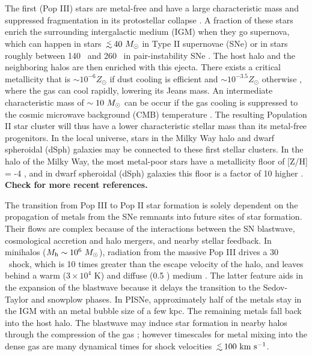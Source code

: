 \documentclass[apjl]{emulateapj}
\begin{document}
The first (Pop III) stars are metal-free and have a large
characteristic mass and suppressed fragmentation in its protostellar
collapse \citep{Abel00, ABN02, Bromm02_P3, Yoshida03, OShea07a}.  A
fraction of these stars enrich the surrounding intergalactic medium
(IGM) when they go supernova, which can happen in stars $\lsim40~\Ms$
in Type II supernovae (SNe) or in stars roughly between 140 \Ms~and
260 \Ms~in pair-instability SNe \citep[PISNe;][]{2002ApJ...567..532H}.
The host halo and the neighboring halos are then enriched with this
ejecta.  There exists a critical metallicity that is $\sim 10^{-6}
Z_\odot$ if dust cooling is efficient \citep{Omukai05,
  Schneider06_Frag, clark08} and $\sim 10^{-3.5} Z_\odot$ otherwise
\citep{Bromm01, 2009ApJ...691..441S}, where the gas can cool rapidly,
lowering its Jeans mass.  An intermediate characteristic mass of
$\sim10~\Ms$ can be occur if the gas cooling is suppressed to the
cosmic microwave background (CMB) temperature \citep{Larson98,
  Tumlinson07_IMF, 2009ApJ...691..441S}.  The resulting Population II
star cluster will thus have a lower characteristic stellar mass than
its metal-free progenitors.  In the local universe, stars in the Milky
Way halo and dwarf spheroidal (dSph) galaxies may be connected to
these first stellar clusters.  In the halo of the Milky Way, the most
metal-poor stars have a metallicity floor of [Z/H] = -4
\citep{Beers05}, and in dwarf spheroidal (dSph) galaxies this floor is
a factor of 10 higher \citep{Tolstoy04, Helmi06}.  \textbf{Check for
  more recent references.}

The transition from Pop III to Pop II star formation is solely
dependent on the propagation of metals from the SNe remnants into
future sites of star formation.  Their flows are complex because of
the interactions between the SN blastwave, cosmological accretion and
halo mergers, and nearby stellar feedback.  In minihalos ($M_{\rm h}
\sim 10^6~\Ms$), radiation from the massive Pop III drives a 30
\kms~shock, which is 10 times greater than the escape velocity of the
halo, and leaves behind a warm ($3 \times 10^4$ K) and diffuse (0.5
\cubecm) medium \citep{Kitayama04, Whalen04, Abel07}.  The latter
feature aids in the expansion of the blastwave because it delays the
transition to the Sedov-Taylor and snowplow phases.  In PISNe,
approximately half of the metals stay in the IGM with an metal bubble
size of a few kpc.  The remaining metals fall back into the host halo.
The blastwave may induce star formation in nearby halos through the
compression of the gas \citep{Ferrara98}; however timescales for metal
mixing into the dense gas are many dynamical times \citep{Cen07} for
shock velocities $\lsim 100~\kms$.
\end{document}
